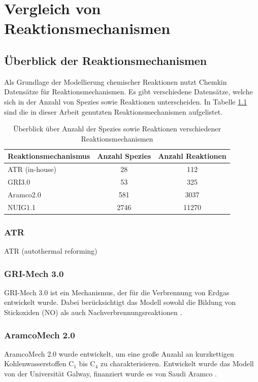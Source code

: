 \documentclass[footmark=none]{tubaf-thesis}
\begin{document}
\chapter{Vergleich von Reaktionsmechanismen}
    \section{Überblick der Reaktionsmechanismen}
    Als Grundlage der Modellierung chemischer Reaktionen nutzt Chemkin Datensätze für Reaktionsmechanismen. Es gibt verschiedene Datensätze, welche sich in der Anzahl von Spezies sowie Reaktionen unterscheiden. In Tabelle \ref{tab:reaktionsmechanismen_überblick} sind die in dieser Arbeit genutzten Reaktionsmechanismen aufgelistet. 
    \begin{table}[H]
        \centering
        \begin{tabular}{lcc}
        \toprule
        \textbf{Reaktionsmechanismus} & \textbf{Anzahl Spezies} & \textbf{Anzahl Reaktionen} \\
        \midrule
        ATR (in-house) & 28 & 112 \\
        GRI3.0         & 53 & 325 \\
        Aramco2.0      & 581 & 3037 \\
        NUIG1.1        & 2746 & 11270 \\
        \bottomrule
        \end{tabular}
        \caption{Überblick über Anzahl der Spezies sowie Reaktionen verschiedener Reaktionsmechanismen}
        \label{tab:reaktionsmechanismen_überblick}
    \end{table}
    \subsection*{ATR}
        ATR (autothermal reforming) 
    \subsection*{GRI-Mech 3.0}
        GRI-Mech 3.0 ist ein Mechanismus, der für die Verbrennung von Erdgas entwickelt wurde. Dabei berücksichtigt das Modell sowohl die Bildung von Stickoxiden (NO) als auch Nachverbrennungsreaktionen \cite{Gri-Mech}.
    \subsection*{AramcoMech 2.0}
        AramcoMech 2.0 wurde entwickelt, um eine große Anzahl an kurzkettigen Kohlenwasserstoffen C$_1$ bis C$_4$ zu charakterisieren. Entwickelt wurde das Modell von der Universität Galway, finanziert wurde es von Saudi Aramco \cite{Aramco20}. 
\end{document}
